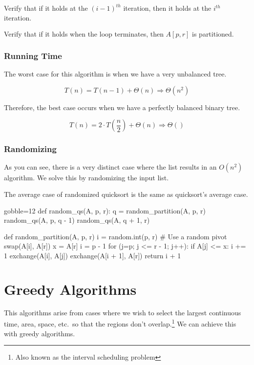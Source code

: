 \documentclass[10pt]{article}
\begin{document}
        Verify that if it holds at the $ (i - 1)^{th}$ iteration, then it holds at the $i^{th}$ iteration.

        Verify that if it holds when the loop terminates, then $ A[p,r] $ is partitioned.

        \subsubsection{Running Time}
        The worst case for this algorithm is when we have a very unbalanced tree.

            \[ T(n) = T(n - 1) + \Theta(n)  \Rightarrow \Theta(n^2) \]

        Therefore, the best case occurs when we have a perfectly balanced binary tree.

            \[ T(n) = 2 \cdot T \left( \frac{n}{2} \right) + \Theta(n) \Rightarrow \Theta() \]

        \subsubsection{Randomizing}
        As you can see, there is a very distinct case where the list results in an $O(n^2)$ algorithm. We solve this by randomizing the input list.

        The average case of randomized quicksort is the same as quicksort's average case.

        \begin{pythoncode*}{gobble=12}
            def random_qs(A, p, r):
                q = random_partition(A, p, r)
                random_qs(A, p, q - 1)
                random_qs(A, q + 1, r)

            def random_partition(A, p, r)
                i = random.int(p, r)  # Use a random pivot
                swap(A[i], A[r])
                x = A[r]
                i = p - 1
                for (j=p; j <= r - 1; j++):
                    if A[j] <= x:
                        i += 1
                        exchange(A[i], A[j])
                exchange(A[i + 1], A[r])
                return i + 1
        \end{pythoncode*}

\section{Greedy Algorithms}
This algorithms arise from cases where we wish to select the largest continuous time, area, space, etc.\ so that the regions don't overlap.\footnote{Also known as the interval scheduling problem} We can achieve this with greedy algorithms.
\end{document}
